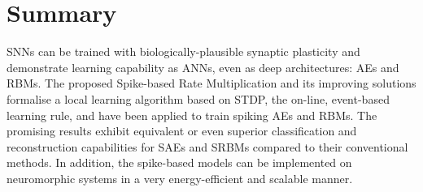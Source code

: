 \section{Summary}
SNNs can be trained with biologically-plausible synaptic plasticity and demonstrate \DIFdelbegin {}\DIFdelend learning capability as \DIFaddbegin {}\DIFaddend ANNs, even as deep architectures: AEs and RBMs.
The proposed Spike-based Rate Multiplication and its improving solutions formalise a local learning algorithm based on STDP, the on-line, event-based learning rule, and have been applied to train spiking AEs and RBMs.
\DIFdelbegin {}\DIFdelend %
The promising results exhibit equivalent or even superior classification and reconstruction capabilities for SAEs and SRBMs compared to their conventional methods.
In addition, the spike-based models can be implemented on neuromorphic systems in a very energy-efficient and scalable manner.

